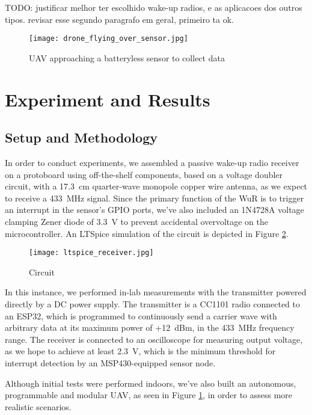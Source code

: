 \documentclass[conference]{IEEEtran}
\begin{document}
TODO: justificar melhor ter escolhido wake-up radios, e as aplicacoes dos outros tipos. revisar esse segundo paragrafo em geral, primeiro ta ok.

\begin{figure}[htbp]
  \centerline{\texttt{[image: drone\_flying\_over\_sensor.jpg]}}
  \caption{UAV approaching a batteryless sensor to collect data}
  \label{fig:drone_over_sensor}
\end{figure}

\section{Experiment and Results}

\subsection{Setup and Methodology}

In order to conduct experiments, we assembled a passive wake-up radio receiver on a protoboard using off-the-shelf components, based on a voltage doubler circuit, with a 17.3~cm quarter-wave monopole copper wire antenna, as we expect to receive a 433~MHz signal. Since the primary function of the WuR is to trigger an interrupt in the sensor's GPIO ports, we've also included an 1N4728A voltage clamping Zener diode of 3.3~V to prevent accidental overvoltage on the microcontroller. An LTSpice simulation of the circuit is depicted in Figure \ref{fig:ltspice_receiver}.

\begin{figure}[htbp]
  \centerline{\texttt{[image: ltspice\_receiver.jpg]}}
  \caption{Circuit}
  \label{fig:ltspice_receiver}
\end{figure}

In this instance, we performed in-lab measurements with the transmitter powered directly by a DC power supply. The transmitter is a CC1101 radio connected to an ESP32, which is programmed to continuously send a carrier wave with arbitrary data at its maximum power of +12~dBm, in the 433~MHz frequency range. The receiver is connected to an oscilloscope for measuring output voltage, as we hope to achieve at least 2.3~V, which is the minimum threshold for interrupt detection by an MSP430-equipped sensor node.

Although initial tests were performed indoors, we've also built an autonomous, programmable and modular UAV, as seen in Figure \ref{fig:drone_over_sensor}, in order to assess more realistic scenarios.
\end{document}
